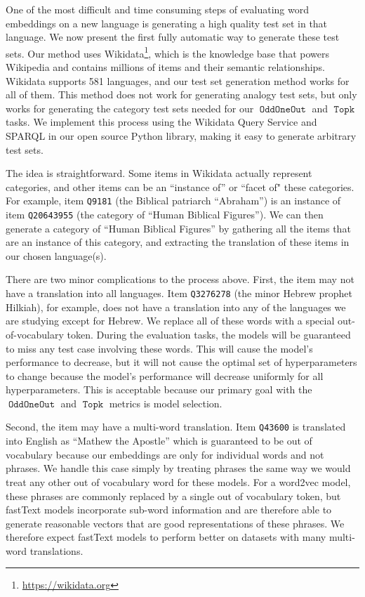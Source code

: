 \documentclass[11pt,a4paper]{article}
\DeclareMathOperator{\OddOneOut}{\texttt{OddOneOut}}
\DeclareMathOperator{\topk}{\texttt{Topk}}
\begin{document}
One of the most difficult and time consuming steps of evaluating word embeddings on a new language is generating a high quality test set in that language.
We now present the first fully automatic way to generate these test sets.
Our method uses Wikidata\footnote{\url{https://wikidata.org}},
which is the knowledge base that powers Wikipedia
and contains millions of items and their semantic relationships.
Wikidata supports 581 languages,
and our test set generation method works for all of them.
This method does not work for generating analogy test sets,
but only works for generating the category test sets needed for our $\OddOneOut$ and $\topk$ tasks. 
We implement this process using the Wikidata Query Service and SPARQL in our open source Python library,
making it easy to generate arbitrary test sets.

The idea is straightforward.
Some items in Wikidata actually represent categories,
and other items can be an ``instance of'' or ``facet of" these categories.
For example, item \texttt{Q9181} (the Biblical patriarch ``Abraham'') 
is an instance of item \texttt{Q20643955} (the category of ``Human Biblical Figures'').
We can then generate a category of ``Human Biblical Figures'' by gathering all the items that are an instance of this category,
and extracting the translation of these items in our chosen language(s).

There are two minor complications to the process above.
First, the item may not have a translation into all languages.
Item \texttt{Q3276278} (the minor Hebrew prophet Hilkiah), for example, does not have a translation into any of the languages we are studying except for Hebrew.
We replace all of these words with a special out-of-vocabulary token.
During the evaluation tasks,
the models will be guaranteed to miss any test case involving these words.
This will cause the model's performance to decrease,
but it will not cause the optimal set of hyperparameters to change because the model's performance will decrease uniformly for all hyperparameters.
This is acceptable because our primary goal with the $\OddOneOut$ and $\topk$ metrics is model selection.

Second, the item may have a multi-word translation.
Item \texttt{Q43600} is translated into English as ``Mathew the Apostle'' which is guaranteed to be out of vocabulary because our embeddings are only for individual words and not phrases.
We handle this case simply by treating phrases the same way we would treat any other out of vocabulary word for these models.
For a word2vec model, these phrases are commonly replaced by a single out of vocabulary token,
but fastText models incorporate sub-word information and are therefore able to generate reasonable vectors that are good representations of these phrases.
We therefore expect fastText models to perform better on datasets with many multi-word translations.
\end{document}
